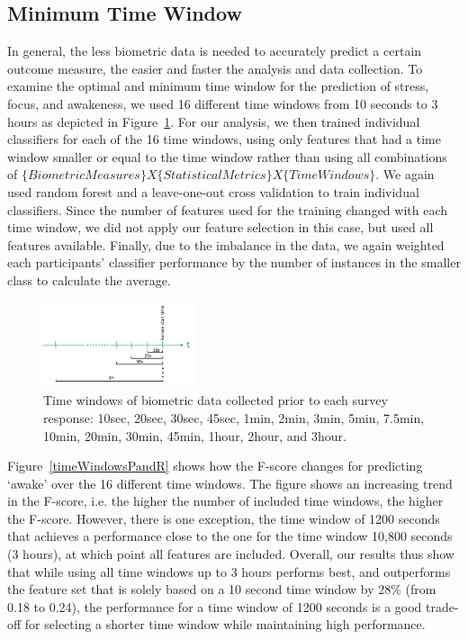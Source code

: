 \subsection{Minimum Time Window}\label{secMinimumTW}
In general, the less biometric data is needed to accurately predict a certain outcome measure, the easier and faster the analysis and data collection. To examine the optimal and minimum time window for the prediction of stress, focus, and awakeness, we used 16 different time windows from 10 seconds to 3 hours as depicted in Figure~\ref{timeWindows}. For our analysis, we then trained individual classifiers for each of the 16 time windows, using only features that had a time window smaller or equal to the time window rather than using all combinations of $\{Biometric Measures\} X \{Statistical Metrics\} X \{Time Windows\}$. We again used random forest and a leave-one-out cross validation to train individual classifiers. Since the number of features used for the training changed with each time window, we did not apply our feature selection in this case, but used all features available. Finally, due to the imbalance in the data, we again weighted each participants' classifier performance by the number of instances in the smaller class to calculate the average.

\begin{figure}
  \centering
      \includegraphics[width=0.4\textwidth]{timeWindows.png}
  \caption{Time windows of biometric data collected prior to each survey response: 10sec, 20sec, 30sec, 45sec, 1min, 2min, 3min, 5min, 7.5min, 10min, 20min, 30min, 45min, 1hour, 2hour, and 3hour.}
   \label{timeWindows}
\end{figure}

Figure~\ref{timeWindowsPandR} shows how the F-score changes for predicting 
`awake' over the 16 different time windows. The figure shows an increasing 
trend in the F-score, i.e. the higher the number of included time windows, 
the higher the F-score. However, there is one exception, the time window of 
1200 seconds that achieves a performance close to the one for the time 
window 10,800 seconds (3 hours), at which point all features are included. 
Overall, our results thus show that while using all time windows up to 3 
hours performs best, and outperforms the feature set that is solely based on 
a 10 second time window by 28\% (from 0.18 to 0.24), the performance for a 
time window of 1200 seconds is a good trade-off for selecting a shorter time 
window while maintaining high performance.

